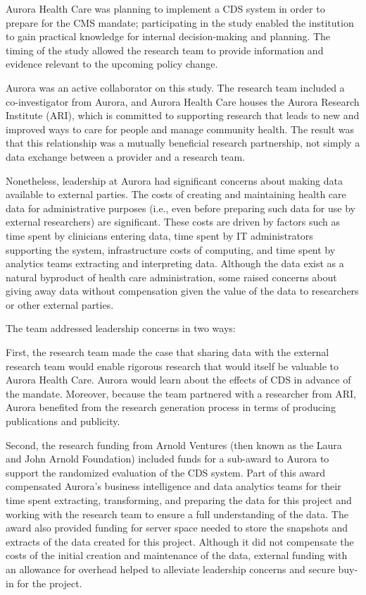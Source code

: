 Aurora Health Care was planning to implement a CDS system in order to prepare for the CMS mandate; participating in the study enabled the institution to gain practical knowledge for internal decision-making and planning. The timing of the study allowed the research team to provide information and evidence relevant to the upcoming policy change.

Aurora was an active collaborator on this study. The research team included a co-investigator from Aurora, and Aurora Health Care houses the Aurora Research Institute (ARI), which is committed to supporting research that leads to new and improved ways to care for people and manage community health. The result was that this relationship was a mutually beneficial research partnership, not simply a data exchange between a provider and a research team.

Nonetheless, leadership at Aurora had significant concerns about making data available to external parties. The costs of creating and maintaining health care data for administrative purposes (i.e., even before preparing such data for use by external researchers) are significant. These costs are driven by factors such as time spent by clinicians entering data, time spent by IT administrators supporting the system, infrastructure costs of computing, and time spent by analytics teams extracting and interpreting data. Although the data exist as a natural byproduct of health care administration, some raised concerns about giving away data without compensation given the value of the data to researchers or other external parties.

The team addressed leadership concerns in two ways:

First, the research team made the case that sharing data with the external research team would enable rigorous research that would itself be valuable to Aurora Health Care. Aurora would learn about the effects of CDS in advance of the mandate. Moreover, because the team partnered with a researcher from ARI, Aurora benefited from the research generation process in terms of producing publications and publicity.

Second, the research funding from Arnold Ventures (then known as the Laura and John Arnold Foundation) included funds for a sub-award to Aurora to support the randomized evaluation of the CDS system. Part of this award compensated Aurora's business intelligence and data analytics teams for their time spent extracting, transforming, and preparing the data for this project and working with the research team to ensure a full understanding of the data. The award also provided funding for server space needed to store the snapshots and extracts of the data created for this project. Although it did not compensate the costs of the initial creation and maintenance of the data, external funding with an allowance for overhead helped to alleviate leadership concerns and secure buy-in for the project.

